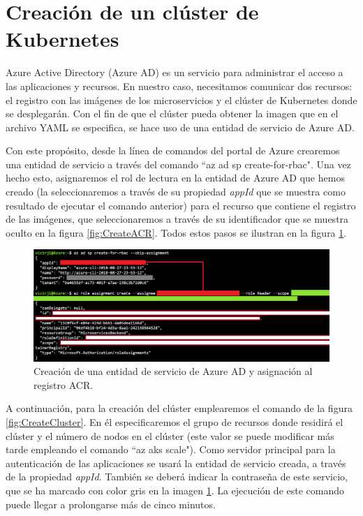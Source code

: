 \documentclass[11pt,spanish,listoffigures]{tfgetsinf}
\begin{document}
\section{Creación de un clúster de Kubernetes} 

Azure Active Directory (Azure AD) es un servicio para administrar el acceso a las aplicaciones y recursos. En nuestro caso, necesitamos comunicar dos recursos: el registro con las imágenes de los microservicios y el clúster de Kubernetes donde se desplegarán. Con el fin de que el clúster pueda obtener la imagen que en el archivo YAML se especifica, se hace uso de una entidad de servicio de Azure AD.

Con este propósito, desde la línea de comandos del portal de Azure crearemos una entidad de servicio a través del comando ``az ad sp create-for-rbac". Una vez hecho esto, asignaremos el rol de lectura en la entidad de Azure AD que hemos creado (la seleccionaremos a través de su propiedad \textit{appId} que se muestra como resultado de ejecutar el comando anterior) para el recurso que contiene el registro de las imágenes, que seleccionaremos a través de su identificador que se muestra oculto en la figura \ref{fig:CreateACR}. Todos estos pasos se ilustran en la figura \ref{fig:ActiveDirectory}.

\begin{figure}[h]
\centering
\includegraphics[scale=0.5]{ActiveDirectory}
\caption{Creación de una entidad de servicio de Azure AD y asignación al registro ACR.}
\label{fig:ActiveDirectory}
\end{figure}

A continuación, para la creación del clúster emplearemos el comando de la figura \ref{fig:CreateCluster}. En él especificaremos el grupo de recursos donde residirá el clúster y el número de nodos en el clúster (este valor se puede modificar más tarde empleando el comando ``az aks scale"). Como servidor principal para la autenticación de las aplicaciones se usará la entidad de servicio creada, a través de la propiedad \textit{appId}. También se deberá indicar la contraseña de este servicio, que se ha marcado con color gris en la imagen \ref{fig:ActiveDirectory}. La ejecución de este comando puede llegar a prolongarse más de cinco  minutos.
\end{document}
